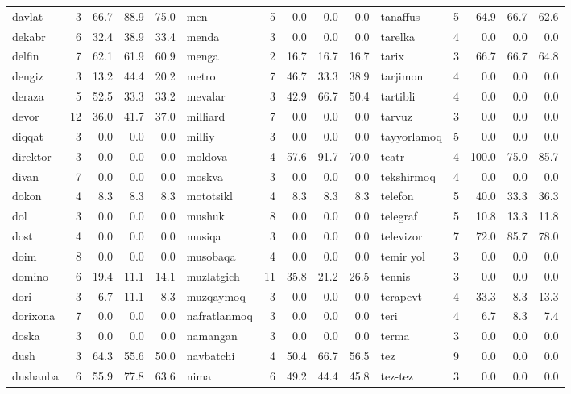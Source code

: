 \documentclass[a4paper,10pt]{article}
\begin{document}
\begin{longtable}{lrrrr|lrrrr|lrrrr}
davlat & 3 & 66.7 & 88.9 & 75.0 & men & 5 & 0.0 & 0.0 & 0.0 & tanaffus & 5 & 64.9 & 66.7 & 62.6 \\
dekabr & 6 & 32.4 & 38.9 & 33.4 & menda & 3 & 0.0 & 0.0 & 0.0 & tarelka & 4 & 0.0 & 0.0 & 0.0 \\
delfin & 7 & 62.1 & 61.9 & 60.9 & menga & 2 & 16.7 & 16.7 & 16.7 & tarix & 3 & 66.7 & 66.7 & 64.8 \\
dengiz & 3 & 13.2 & 44.4 & 20.2 & metro & 7 & 46.7 & 33.3 & 38.9 & tarjimon & 4 & 0.0 & 0.0 & 0.0 \\
deraza & 5 & 52.5 & 33.3 & 33.2 & mevalar & 3 & 42.9 & 66.7 & 50.4 & tartibli & 4 & 0.0 & 0.0 & 0.0 \\
devor & 12 & 36.0 & 41.7 & 37.0 & milliard & 7 & 0.0 & 0.0 & 0.0 & tarvuz & 3 & 0.0 & 0.0 & 0.0 \\
diqqat & 3 & 0.0 & 0.0 & 0.0 & milliy & 3 & 0.0 & 0.0 & 0.0 & tayyorlamoq & 5 & 0.0 & 0.0 & 0.0 \\
direktor & 3 & 0.0 & 0.0 & 0.0 & moldova & 4 & 57.6 & 91.7 & 70.0 & teatr & 4 & 100.0 & 75.0 & 85.7 \\
divan & 7 & 0.0 & 0.0 & 0.0 & moskva & 3 & 0.0 & 0.0 & 0.0 & tekshirmoq & 4 & 0.0 & 0.0 & 0.0 \\
do\textquotesingle{}kon & 4 & 8.3 & 8.3 & 8.3 & mototsikl & 4 & 8.3 & 8.3 & 8.3 & telefon & 5 & 40.0 & 33.3 & 36.3 \\
do\textquotesingle{}l & 3 & 0.0 & 0.0 & 0.0 & mushuk & 8 & 0.0 & 0.0 & 0.0 & telegraf & 5 & 10.8 & 13.3 & 11.8 \\
do\textquotesingle{}st & 4 & 0.0 & 0.0 & 0.0 & musiqa & 3 & 0.0 & 0.0 & 0.0 & televizor & 7 & 72.0 & 85.7 & 78.0 \\
doim & 8 & 0.0 & 0.0 & 0.0 & musobaqa & 4 & 0.0 & 0.0 & 0.0 & temir yo\textquotesingle{}l & 3 & 0.0 & 0.0 & 0.0 \\
domino & 6 & 19.4 & 11.1 & 14.1 & muzlatgich & 11 & 35.8 & 21.2 & 26.5 & tennis & 3 & 0.0 & 0.0 & 0.0 \\
dori & 3 & 6.7 & 11.1 & 8.3 & muzqaymoq & 3 & 0.0 & 0.0 & 0.0 & terapevt & 4 & 33.3 & 8.3 & 13.3 \\
dorixona & 7 & 0.0 & 0.0 & 0.0 & nafratlanmoq & 3 & 0.0 & 0.0 & 0.0 & teri & 4 & 6.7 & 8.3 & 7.4 \\
doska & 3 & 0.0 & 0.0 & 0.0 & namangan & 3 & 0.0 & 0.0 & 0.0 & terma & 3 & 0.0 & 0.0 & 0.0 \\
dush & 3 & 64.3 & 55.6 & 50.0 & navbatchi & 4 & 50.4 & 66.7 & 56.5 & tez & 9 & 0.0 & 0.0 & 0.0 \\
dushanba & 6 & 55.9 & 77.8 & 63.6 & nima & 6 & 49.2 & 44.4 & 45.8 & tez-tez & 3 & 0.0 & 0.0 & 0.0 \\

\end{longtable}
\end{document}

